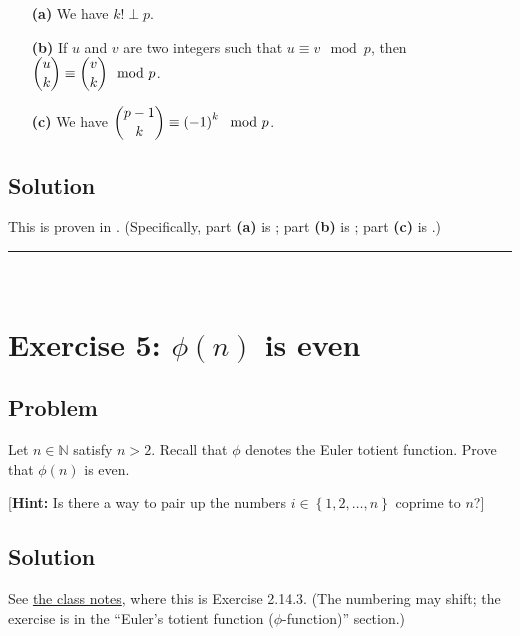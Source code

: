 \documentclass[paper=a4, fontsize=12pt]{scrartcl} %
\newcommand{\NN}{\mathbb{N}} %
\newcommand{\set}[1]{\left\{ #1 \right\}}
\newcommand{\tup}[1]{\left( #1 \right)}
\newcommand{\horrule}[1]{\rule{\linewidth}{#1}} %
\theoremstyle{plainsl}
\theoremstyle{definition}
\theoremstyle{remark}
\begin{document}
\begin{enumerate}

\item[\textbf{(a)}]
We have $k! \perp p$.

\item[\textbf{(b)}]
If $u$ and $v$ are two integers such that $u \equiv v \mod p$,
then
$\dbinom{u}{k} \equiv \dbinom{v}{k} \mod p$.

\item[\textbf{(c)}]
We have $\dbinom{p-1}{k} \equiv \tup{-1}^k \mod p$.

\end{enumerate}

\subsection{Solution}

This is proven in \cite[Section 5]{fleck}.
(Specifically, part \textbf{(a)} is \cite[Lemma 5.2]{fleck};
part \textbf{(b)} is \cite[Proposition 5.5]{fleck};
part \textbf{(c)} is \cite[Proposition 3.1]{fleck}.)

\horrule{0.3pt} \\[0.4cm]

\section{Exercise 5: $\phi\tup{n}$ is even}

\subsection{Problem}

Let $n \in \NN$ satisfy $n > 2$.
Recall that $\phi$ denotes the Euler totient function.
Prove that $\phi\tup{n}$ is even.

[\textbf{Hint:} Is there a way to pair up the numbers
$i \in \set{1, 2, \ldots, n}$ coprime to $n$?]

\subsection{Solution}

See
\href{http://www-users.math.umn.edu/~dgrinber/19s/notes.pdf}{the class notes},
where this is Exercise 2.14.3.
(The numbering may shift; the exercise is in the
``Euler's totient function ($\phi$-function)''
section.)
\end{document}
